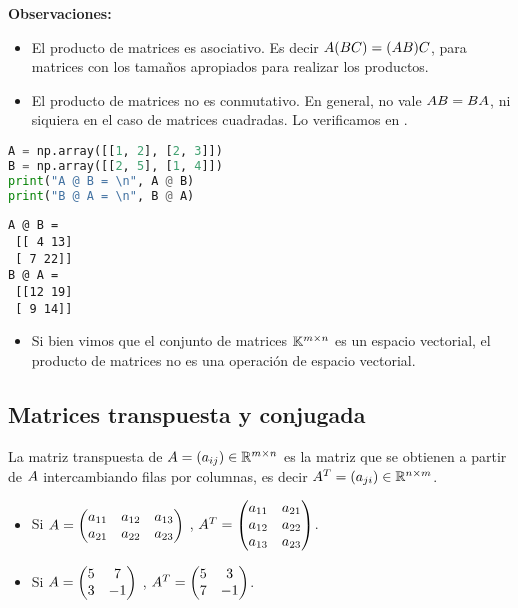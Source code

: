 \textbf{Observaciones:}

\begin{itemize}
\item El producto de matrices es asociativo. Es decir $\Ab(\Bb\Cb) = (\Ab\Bb)\Cb$, para matrices con los tamaños apropiados para realizar los productos.
\item El producto de matrices no es conmutativo. En general, no vale $\Ab \Bb = \Bb \Ab$, ni siquiera en el caso de matrices cuadradas. Lo verificamos en \python.
\end{itemize}

\begin{Shaded}
\begin{lstlisting}[language=Python]
A = np.array([[1, 2], [2, 3]])
B = np.array([[2, 5], [1, 4]])
print("A @ B = \n", A @ B)
print("B @ A = \n", B @ A)
\end{lstlisting}
\end{Shaded}

\begin{verbatim}
A @ B =
 [[ 4 13]
 [ 7 22]]
B @ A =
 [[12 19]
 [ 9 14]]
\end{verbatim}

\begin{itemize}
\item Si bien vimos que el conjunto de matrices $\mathbb K^{m \times n}$ es un espacio vectorial, el producto de matrices no es una operación de espacio vectorial.
\end{itemize}

\subsection{Matrices transpuesta y conjugada}

La matriz transpuesta de $\Ab = (a_{ij}) \in {\R^{m \times n}}$ es la matriz que se obtienen a partir de $\Ab$ intercambiando filas por columnas, es decir $\Ab^T = (a_{ji}) \in \R^{n \times m}$.

\begin{ejemplo}\leavevmode
\begin{itemize}
\item Si $\Ab =\begin{pmatrix}a_{11}&a_{12}&a_{13} \\ a_{21}&a_{22}&a_{23}\end{pmatrix}$ , $\Ab^T = \begin{pmatrix}a_{11}&a_{21}\\a_{12} & a_{22} \\ a_{13} & a_{23}\end{pmatrix}$.
\item Si $\Ab =\begin{pmatrix}5&7 \\ 3&-1\end{pmatrix}$ , $\Ab^T = \begin{pmatrix}5&3\\7 & -1 \end{pmatrix}$.
\end{itemize}
\end{ejemplo}

